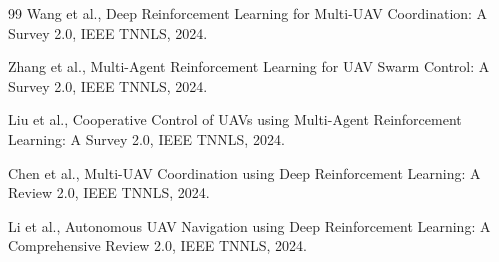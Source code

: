 \documentclass[12pt,a4paper]{ctexart}
\begin{document}
\begin{thebibliography}{99}
 Wang et al., Deep Reinforcement Learning for Multi-UAV Coordination: A Survey 2.0, IEEE TNNLS, 2024.

 Zhang et al., Multi-Agent Reinforcement Learning for UAV Swarm Control: A Survey 2.0, IEEE TNNLS, 2024.

 Liu et al., Cooperative Control of UAVs using Multi-Agent Reinforcement Learning: A Survey 2.0, IEEE TNNLS, 2024.

 Chen et al., Multi-UAV Coordination using Deep Reinforcement Learning: A Review 2.0, IEEE TNNLS, 2024.

 Li et al., Autonomous UAV Navigation using Deep Reinforcement Learning: A Comprehensive Review 2.0, IEEE TNNLS, 2024.

\end{thebibliography}
\end{document}

